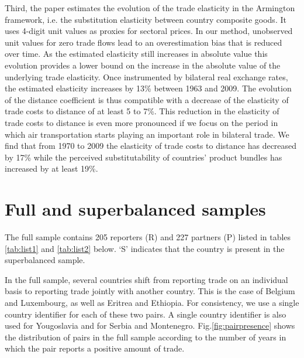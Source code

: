 \documentclass[12pt,twoside,a4paper,notitlepage]{article}
\newcommand{\revLA}[1]{\textcolor{red}{\footnotesize\textit{{revLA: #1}}}} %
\def\revLA #1{} %
\begin{document}
{Third, the paper estimates the evolution of the trade elasticity in the Armington framework, i.e. the substitution elasticity between country composite goods. It uses 4-digit unit values as proxies for sectoral prices. In our method, unobserved unit values for zero trade flows lead to an overestimation bias that is reduced over time. As the estimated elasticity still increases in absolute value this%
 evolution provides a lower bound on the increase in the absolute value of the underlying trade elasticity. Once instrumented by bilateral real exchange rates, the estimated elasticity increases by 13\% between 1963 and 2009. The evolution of the distance coefficient is thus compatible with a decrease of the elasticity of trade costs to distance of at least 5 to 7\%. This reduction in the elasticity of trade costs to distance is even more pronounced if we focus on the period in which air transportation starts playing an important role in bilateral trade. We find that from 1970 to 2009 the elasticity of trade costs to distance has decreased by 17\% while the perceived substitutability of countries' product bundles has increased by at least 19\%.



%

%


\clearpage
\appendix
\revLA{I updated numbers in the text and graphs by defining the superbalanced sample for 1962-2013.}
\section{Full and superbalanced samples} \label{app:E}
The full sample contains 205 reporters (R) and 227 partners (P) listed in tables \ref{tab:list1} and \ref{tab:list2} below. `S' indicates that the country is present in the superbalanced sample. 

In the full sample, several countries shift from reporting trade on an individual basis to reporting trade jointly with another country. This is the case of Belgium and Luxembourg, as well as Eritrea and Ethiopia. For consistency, we use a single country identifier for each of these two pairs. A single country identifier is also used for Yougoslavia and for Serbia and Montenegro. Fig.\ref{fig:pairpresence} shows the distribution of pairs in the full sample according to the number of years in which the pair reports a positive amount of trade.

}
\end{document}

